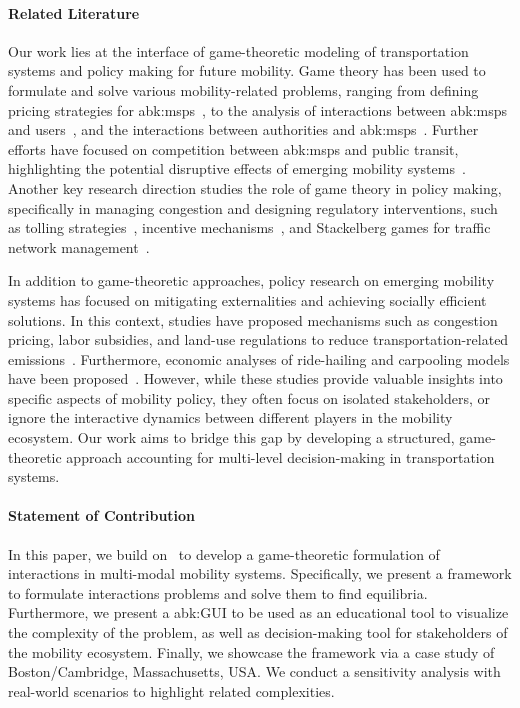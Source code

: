 \paragraph{Related Literature}
Our work lies at the interface of game-theoretic modeling of transportation systems and policy making for future mobility.
Game theory has been used to formulate and solve various mobility-related problems, ranging from defining pricing strategies for \glspl{abk:msp}~\cite{mingbao2010pricing, gong2014analysis, chen2016management, kuiteing2017network, bimpikis2019spatial, yang2019subsidy, seo24tcns}, to the analysis of interactions between \glspl{abk:msp} and users~\cite{lei2018evolutionary, dandl2019autonomous, turan2021competition}, and the interactions between authorities and \glspl{abk:msp}~\cite{hernandez2018game, di2019unified, mo2021dynamic, balac2019modeling, lanzetti2023interplay}.
Further efforts have focused on competition between \glspl{abk:msp} and public transit, highlighting the potential disruptive effects of emerging mobility systems~\cite{krichene2017stackelberg, lazar2020optimal}.
Another key research direction studies the role of game theory in policy making, specifically in managing congestion and designing regulatory interventions, such as tolling strategies~\cite{bianco2016game}, incentive mechanisms~\cite{swamy2012effectiveness, paccagnan2021optimal, lazar2020optimal}, and Stackelberg games for traffic network management~\cite{krichene2017stackelberg}.

In addition to game-theoretic approaches, policy research on emerging mobility systems has focused on mitigating externalities and achieving socially efficient solutions.
In this context, studies have proposed mechanisms such as congestion pricing, labor subsidies, and land-use regulations to reduce transportation-related emissions~\cite{fullerton2002can, iwata2016can, zhang2016optimal, maljkovic2023hierarchical}.
Furthermore, economic analyses of ride-hailing and carpooling models have been proposed~\cite{zoepf2018economics,ostrovsky2019carpooling}.
However, while these studies provide valuable insights into specific aspects of mobility policy, they often focus on isolated stakeholders, or ignore the interactive dynamics between different players in the mobility ecosystem.
%
Our work aims to bridge this gap by developing a structured, game-theoretic approach accounting for multi-level decision-making in transportation systems.
\paragraph{Statement of Contribution}
In this paper, we build on~\cite{belgioioso2021semi, zardini2021game, zardini2022} to develop a game-theoretic formulation of interactions in multi-modal mobility systems.
Specifically, we present a framework to formulate interactions problems and solve them to find equilibria.
Furthermore, we present a \gls{abk:GUI} to be used as an educational tool to visualize the complexity of the problem, as well as decision-making tool for stakeholders of the mobility ecosystem. 
Finally, we showcase the framework via a case study of Boston/Cambridge, Massachusetts, USA. 
We conduct a sensitivity analysis with real-world scenarios to highlight related complexities.
